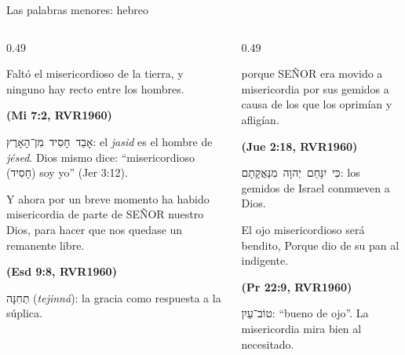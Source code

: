 \documentclass[hyperref={bookmarks=false},aspectratio=169]{beamer}
\newcommand{\heb}[1]{\mbox{\foreignlanguage{hebrew}{#1}}}
\newcommand{\SENOR}{S{\fontsize{0.78em}{1em}\selectfont EÑOR}}
\newcommand{\fuente}[1]{\par\hfill{\upshape\bfseries\footnotesize\textcolor{azul}{#1}}}
\begin{document}
\begin{frame}{Las palabras menores: hebreo}
\begin{columns}[t,onlytextwidth]
\begin{column}{0.49\textwidth}
\begin{cita}Faltó el misericordioso de la tierra, y ninguno hay recto entre los hombres.\fuente{(Mi 7:2, RVR1960)}\end{cita}
\scriptsize\heb{אָבַד חָסִיד מִן־הָאָרֶץ}: el \emph{jasid} es el hombre de \emph{jésed}. Dios mismo dice: ``misericordioso (\heb{חָסִיד}) soy yo'' (Jer 3:12).
\begin{cita}Y ahora por un breve momento ha habido misericordia de parte de \SENOR{} nuestro Dios, para hacer que nos quedase un remanente libre.\fuente{(Esd 9:8, RVR1960)}\end{cita}
\scriptsize\heb{תְחִנָּה} (\emph{tejinná}): la gracia como respuesta a la súplica.
\end{column}
\begin{column}{0.49\textwidth}
\begin{cita}porque \SENOR{} era movido a misericordia por sus gemidos a causa de los que los oprimían y afligían.\fuente{(Jue 2:18, RVR1960)}\end{cita}
\scriptsize\heb{כִּי יִנָּחֵם יְהוָה מִנַּאֲקָתָם}: los gemidos de Israel conmueven a Dios.
\begin{cita}El ojo misericordioso será bendito, Porque dio de su pan al indigente.\fuente{(Pr 22:9, RVR1960)}\end{cita}
\scriptsize\heb{טוֹב־עַיִן}: ``bueno de ojo''. La misericordia mira bien al necesitado.
\end{column}
\end{columns}
\end{frame}
\end{document}
